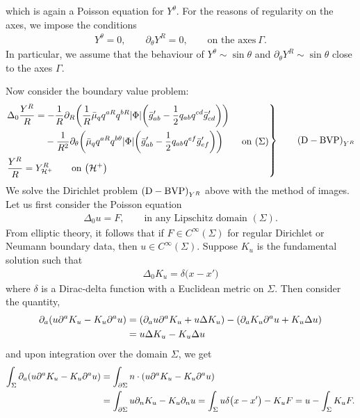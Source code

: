 \documentclass[pdftex]{sigma}
\def\ptl{\partial}%
\def\halb{\frac{1}{2}}%
\numberwithin{equation}{section}
\begin{document}
which is again a Poisson equation for $Y^\theta$. For the reasons of regularity on the axes, we impose the conditions \cite{O_Rinne_J_Stewart_2005}{\samepage
\begin{align*}
Y^ \theta =0, \qquad \ptl_\theta Y^R =0, \qquad \text{on the axes} \ \Gamma.
\end{align*}
In particular, we assume that the behaviour of $Y^\theta \sim \sin \theta$ and $\ptl_\theta Y^R \sim \sin \theta$ close to the axes $\Gamma$.}

Now consider the boundary value problem:
\begin{equation*}
\left.\begin{aligned}
&\Delta_0 \frac{Y^R}{R} =- \frac{1}{R} \ptl_R \biggl(\frac{1}{R} \bar{\mu}_q q^{aR} q^{bR} \vert \Phi \vert \biggl(\bar{g}'_{ab} - \halb q_{ab} q^{cd} \bar{g}'_{cd}\biggr)\biggr) \notag \\
&\hphantom{\Delta_0 \frac{Y^R}{R} =}{} -\frac{1}{R^2} \ptl_ \theta \biggl(\bar{\mu}_q q^{aR} q^{b\theta} \vert \Phi \vert \biggl(\bar{g}'_{ab} - \halb q_{ab} q^{ef} \bar{g}'_{ef}\biggr)\biggr) \qquad \text{on} \ (\Sigma)\\
&\frac{Y^R}{R}= Y^R_{\mathcal{H}^+} \qquad \text{on} \ \bigl(\mathcal{H}^+\bigr)
\end{aligned}
 \right\}
\qquad {\rm (D-BVP)}_{Y^R}
\end{equation*}
We solve the Dirichlet problem ${\rm (D-BVP)}_{Y^R}$ above with the method of images. Let us first consider the Poisson equation
\begin{align*}
\Delta_0 u= F, \qquad \text{in any Lipschitz domain $(\Sigma)$}.
\end{align*}
From elliptic theory, it follows that if $F \in C^{\infty} (\Sigma)$ for regular Dirichlet or Neumann boundary data, then $u \in C^{\infty} (\Sigma)$.
Suppose $K_u$ is the fundamental solution such that
\begin{align*}
\Delta_0 K_u = \delta \bigl(x-x'\bigr)
\end{align*}
where $\delta$ is a Dirac-delta function with a Euclidean metric on $\Sigma$.
Then consider the quantity,
\begin{align*}
\ptl_a (u \ptl^a K_u - K_u \ptl^a u) &{}= (\ptl_a u \ptl^a K_u+ u \Delta K_u) - (\ptl_a K_u \ptl^a u + K_u \Delta u) \notag\\
&{}= u \Delta K_u - K_u \Delta u
\end{align*}
and upon integration over the domain $\Sigma$, we get
\begin{align*}
\int_{\Sigma} \ptl_a (u \ptl^a K_{u} - K_{u} \ptl^a u) &{}= \int_{\ptl \Sigma} n \cdot (u\ptl^a K_{u} - K_{u} \ptl^a u) \notag \\
&{}= \int_{\ptl \Sigma} u \ptl_n K_u - K_u \ptl_n u
= \int_{\Sigma} u\delta \bigl(x-x'\bigr) - K_u F = u - \int_{\Sigma} K_u F.
\end{align*}
\end{document}
